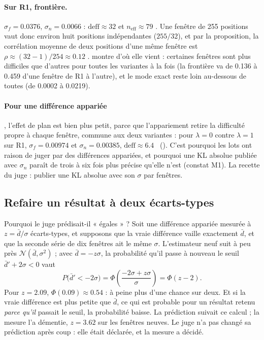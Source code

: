 \paragraph{Sur R1, frontière.} $\sigma_f = \num{0.0376}$, $\sigma_n = \num{0.0066}$ : $\mathrm{deff} \approx 32$ et $n_{\text{eff}} \approx 79$ \calc. Une fenêtre de 255 positions vaut donc environ huit positions indépendantes ($255/32$), et par la proposition, la corrélation moyenne de deux positions d'une même fenêtre est $\rho \approx (32 - 1)/254 \approx \num{0.12}$ \calc.  montre d'où elle vient : certaines fenêtres sont plus difficiles que d'autres pour toutes les variantes à la fois (la frontière va de \num{0.136} à \num{0.459} d'une fenêtre de R1 à l'autre), et le mode exact reste loin au-dessous de toutes (de \num{0.0002} à \num{0.0219}).

\begin{figure}[tbp]
\centering
\GrapheJconsFenetres
{}
\label{fig:t3-jcons-fenetres}
\end{figure}

\paragraph{Pour une différence appariée}, l'effet de plan est bien plus petit, parce que l'appariement retire la difficulté propre à chaque fenêtre, commune aux deux variantes : pour $\lambda = 0$ contre $\lambda = 1$ sur R1, $\sigma_f = \num{0.00974}$ et $\sigma_n = \num{0.00385}$, $\mathrm{deff} \approx \num{6.4}$ \calc\ (). C'est pourquoi les lots ont raison de juger par des différences appariées, et pourquoi une KL absolue publiée avec $\sigma_n$ paraît de trois à six fois plus précise qu'elle n'est (constat M1). La recette du juge : publier une KL absolue avec son $\sigma$ par fenêtres.

\subsection{Refaire un résultat à deux écarts-types}\label{t3jug:sec:refaire}

Pourquoi le juge prédisait-il « égales » ? Soit une différence appariée mesurée à $z = \bar d/\sigma$ écarts-types, et supposons que la vraie différence vaille exactement $\bar d$, et que la seconde série de dix fenêtres ait le même $\sigma$. L'estimateur neuf suit à peu près $\mathcal{N}(\bar d, \sigma^2)$ ; avec $\bar d = -z\sigma$, la probabilité qu'il passe à nouveau le seuil $\bar d' + 2\sigma < 0$ vaut
\[
P\bigl(\bar d' < -2\sigma\bigr) = \Phi\!\left(\frac{-2\sigma + z\sigma}{\sigma}\right) = \Phi(z - 2).
\]
Pour $z = \num{2.09}$, $\Phi(\num{0.09}) \approx \num{0.54}$ \calc : à peine plus d'une chance sur deux. Et si la vraie différence est plus petite que $\bar d$, ce qui est probable pour un résultat retenu \emph{parce qu'il} passait le seuil, la probabilité baisse. La prédiction suivait ce calcul ; la mesure l'a démentie, $z = \num{3.62}$ sur les fenêtres neuves. Le juge n'a pas changé sa prédiction après coup : elle était déclarée, et la mesure a décidé.

